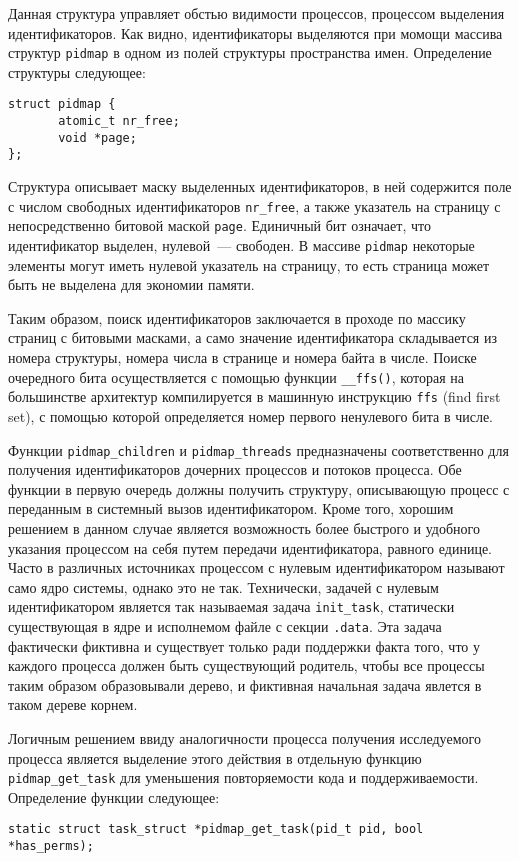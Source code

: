 Данная структура управляет обстью видимости процессов, процессом выделения
идентификаторов. Как видно, идентификаторы выделяются при момощи массива
структур \texttt{pidmap} в одном из полей структуры пространства имен.
Определение структуры следующее:
\medskip
\begin{lstlisting}[style=cstyle]
struct pidmap {
       atomic_t nr_free;
       void *page;
};
\end{lstlisting}
\medskip

Структура описывает маску выделенных идентификаторов, в ней содержится поле с
числом свободных идентификаторов \texttt{nr\_free}, а также указатель на
страницу с непосредственно битовой маской \texttt{page}. Единичный бит означает,
что идентификатор выделен, нулевой~--- свободен. В массиве \texttt{pidmap}
некоторые элементы могут иметь нулевой указатель на страницу, то есть страница
может быть не выделена для экономии памяти.

Таким образом, поиск идентификаторов заключается в проходе по массику страниц с
битовыми масками, а само значение идентификатора складывается из номера
структуры, номера числа в странице и номера байта в числе. Поиске очередного
бита осуществляется с помощью функции \texttt{\_\_ffs()}, которая на большинстве
архитектур компилируется в машинную инструкцию \texttt{ffs} (find first set), с
помощью которой определяется номер первого ненулевого бита в числе.

Функции \texttt{pidmap\_children} и \texttt{pidmap\_threads} предназначены
соответственно для получения идентификаторов дочерних процессов и потоков
процесса. Обе функции в первую очередь должны получить структуру, описывающую
процесс с переданным в системный вызов идентификатором. Кроме того, хорошим
решением в данном случае является возможность более быстрого и удобного указания
процессом на себя путем передачи идентификатора, равного единице. Часто в
различных источниках процессом с нулевым идентификатором называют само ядро
системы, однако это не так. Технически, задачей с нулевым идентификатором
является так называемая задача \texttt{init\_task}, статически существующая в
ядре и исполнемом файле с секции \texttt{.data}. Эта задача фактически фиктивна
и существует только ради поддержки факта того, что у каждого процесса должен
быть существующий родитель, чтобы все процессы таким образом образовывали
дерево, и фиктивная начальная задача явлется в таком дереве корнем.

Логичным решением ввиду аналогичности процесса получения исследуемого процесса
является выделение этого действия в отдельную функцию \texttt{pidmap\_get\_task}
для уменьшения повторяемости кода и поддерживаемости. Определение функции
следующее:
\medskip
\begin{lstlisting}[style=cstyle]
static struct task_struct *pidmap_get_task(pid_t pid, bool *has_perms);
\end{lstlisting}
\medskip



